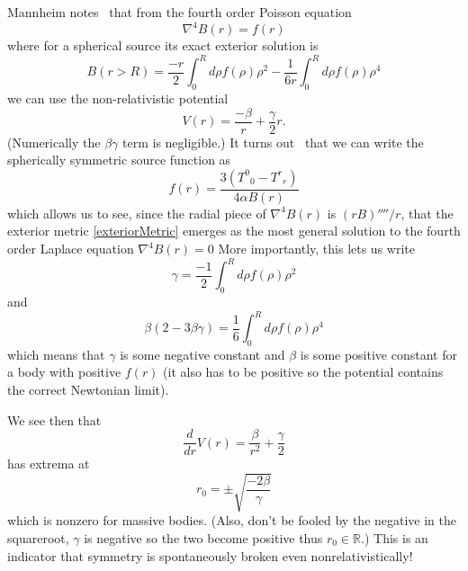 
Mannheim notes~\cite{Mannheim:1993rs} that from the fourth order
Poisson equation
\begin{equation}
\nabla^{4}B(r) = f(r)
\end{equation} 
where for a spherical source its exact exterior solution is
\begin{equation}
B(r>R) = \frac{-r}{2}\int^{R}_{0}d\rho f(\rho)\rho^2 -
\frac{1}{6r}\int^{R}_{0}d\rho f(\rho)\rho^4
\end{equation}
we can use the non-relativistic potential
\begin{equation}
V(r) = \frac{-\beta}{r} + \frac{\gamma}{2}r.
\end{equation}
(Numerically the $\beta\gamma$ term is negligible.) It turns
out~\cite{Mannheim:1994ph} that we can write the spherically
symmetric source function as
\begin{equation}
f(r) = \frac{3({T^{0}}_{0} - {T^{r}}_{r})}{4\alpha B(r)}
\end{equation}
which allows us to see, since the radial piece of
$\nabla^{4}B(r)$ is $(rB)''''/r$, that the exterior metric
\eqref{exteriorMetric} emerges as the most general solution to
the fourth order Laplace equation $\nabla^4 B(r)=0$ More
importantly, this lets us write
\begin{equation}
\gamma = \frac{-1}{2}\int^{R}_{0}d\rho f(\rho) \rho^2
\end{equation}
and
\begin{equation}
\beta(2-3\beta\gamma) = \frac{1}{6}\int^{R}_{0}d\rho
f(\rho)\rho^{4}
\end{equation}
which means that $\gamma$ is some negative constant and $\beta$
is some positive constant for a body with positive $f(r)$ (it
also has to be positive so the potential contains the correct
Newtonian limit).

We see then that
\begin{equation}
\frac{d}{dr}V(r) = \frac{\beta}{r^2} + \frac{\gamma}{2}
\end{equation}
has extrema at
\begin{equation}
r_{0} = \pm\sqrt{\frac{-2\beta}{\gamma}}
\end{equation}
which is nonzero for massive bodies. (Also, don't be fooled by
the negative in the squareroot, $\gamma$ is negative so the two
become positive thus $r_0\in\mathbb{R}$.) This is an indicator
that symmetry is spontaneously broken even nonrelativistically!
